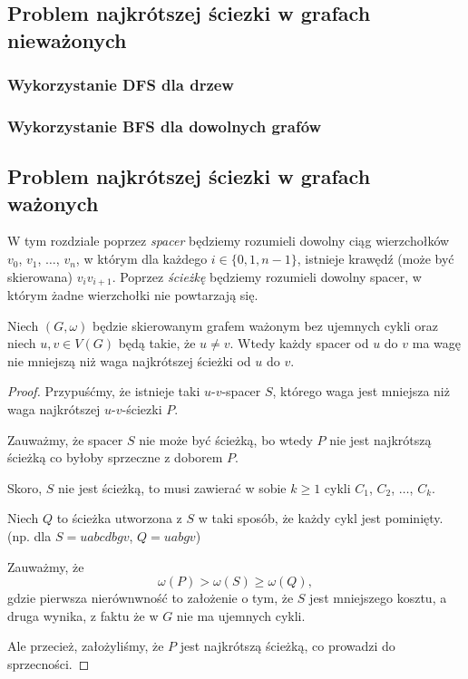 \subsection{Problem najkrótszej ściezki w grafach nieważonych}
\subsubsection{Wykorzystanie DFS dla drzew}
\subsubsection{Wykorzystanie BFS dla dowolnych grafów}

\subsection{Problem najkrótszej ściezki w grafach ważonych}

W tym rozdziale poprzez \textit{spacer} będziemy rozumieli dowolny
ciąg wierzchołków $v_0$, $v_1$, $\dots$, $v_{n}$, w 
którym dla każdego $i \in \{0, 1, n-1\}$,
istnieje krawędź (może być skierowana)
$v_iv_{i+1}$. Poprzez \textit{ścieżkę}
będziemy rozumieli dowolny spacer, w którym
żadne wierzchołki nie powtarzają się.

\begin{lemma}
	Niech $(G,\omega)$ będzie skierowanym grafem ważonym 
	bez ujemnych cykli oraz niech $u,v \in V(G)$ będą
	takie, że $u \neq v$. Wtedy
	każdy spacer od $u$ do $v$ ma wagę nie 
	mniejszą niż waga
	najkrótszej ścieżki od $u$ do $v$.
	\begin{proof}
		Przypuśćmy, że istnieje taki $u$-$v$-spacer $S$, 
		którego waga jest mniejsza niż waga najkrótszej
		$u$-$v$-ściezki $P$. 
		
		Zauważmy, że spacer $S$ nie może być ścieżką, 
		bo wtedy $P$ nie jest najkrótszą ścieżką co 
		byłoby sprzeczne z doborem $P$.
		
		Skoro, $S$ nie jest ścieżką, to musi zawierać
		w sobie $k\geq 1$ cykli $C_1$, $C_2$, $\dots$, $C_k$. 
		
		Niech $Q$ to ścieżka utworzona z $S$ w taki sposób,
		że każdy cykl jest pominięty. (np. dla $S=uabcdbgv$, 
		$Q=uabgv$)
		
		Zauważmy, że
		\[\omega(P) > \omega(S) \geq \omega(Q),\]
		gdzie pierwsza nierównwność to założenie o
		tym, że $S$ jest mniejszego kosztu, a druga wynika,
		z faktu że w $G$ nie ma ujemnych cykli.
		
		Ale przecież, założyliśmy, że $P$ jest najkrótszą ścieżką,
		co prowadzi do sprzecności.
		
	\end{proof}
	\label{minpath_walk}
\end{lemma}

